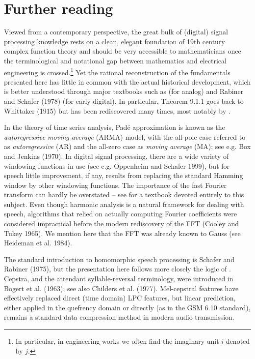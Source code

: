 \section{Further reading}

Viewed from a contemporary perspective, the great bulk of (digital) signal
processing knowledge rests on a clean, elegant foundation of 19th century
complex function theory and should be very accessible to mathematicians once
the terminological and notational gap between mathematics and electrical
engineering is crossed.\footnote{In particular, in engineering works we often
  find the imaginary unit $i$ denoted by $j$.} Yet the rational reconstruction
of the fundamentals presented here has little in common with the actual
historical development, which is better understood through major textbooks
such as  (for analog) and Rabiner and Schafer (1978)
(for early digital).\nocite{Whittaker:1915}\nocite{Rabiner:1978} In
particular, Theorem 9.1.1 goes back to Whittaker (1915) but has been
rediscovered many times, most notably by .

In the theory of time series analysis, Pad\'e approximation is known as the
{\it autoregressive moving average} (ARMA) model, with the all-pole case
referred to as {\it autoregressive} (AR) and the all-zero case as {\it moving
  average} (MA); see e.g. Box and Jenkins (1970).\nocite{Box:1970} In digital
signal processing, there are a wide variety of windowing functions in use (see
e.g. Oppenheim and Schafer 1999),\nocite{Oppenheim:1999} but for speech little
improvement, if any, results from replacing the standard Hamming window by
other windowing functions. The importance of the fast Fourier transform can
hardly be overstated -- see  for a textbook devoted
entirely to this subject. Even though harmonic analysis is a natural framework
for dealing with speech, algorithms that relied on actually computing Fourier
coefficients were considered impractical before the modern rediscovery of the
FFT (Cooley and Tukey 1965).\nocite{Cooley:1965} We mention here that the FFT
was already known to Gauss (see Heideman et al. 1984).\nocite{Heideman:1984}

The standard introduction to homomorphic speech processing is Schafer and
Rabiner (1975),\nocite{Schafer:1975} but the presentation here follows more
closely the logic of . Cepstra, and the attendant
syllable-reversal terminology, were introduced in Bogert et al.
(1963);\nocite{Bogert:1963} see also Childers et al.
(1977).\nocite{Childers:1977} Mel-cepstral features have effectively replaced
direct (time domain) LPC features, but linear prediction, either applied in
the quefrency domain or directly (as in the GSM 6.10 standard), remains a
standard data compression method in modern audio transmission.

